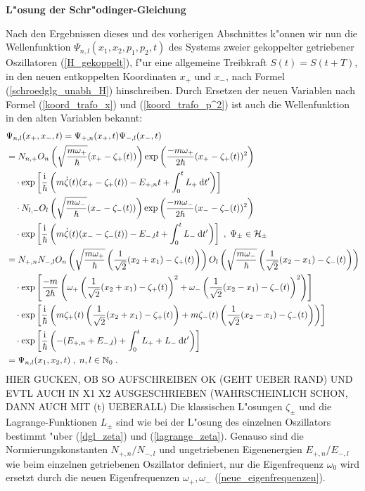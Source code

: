   \textbf{L"osung der Schr"odinger-Gleichung}

  Nach den Ergebnissen dieses und des vorherigen Abschnittes k"onnen wir nun die Wellenfunktion $\Psi_{n,l}(x_1,x_2,p_1,p_2,t)$ des Systems zweier gekoppelter getriebener Oszillatoren (\ref{H_gekoppelt}), f"ur eine allgemeine Treibkraft $S(t)=S(t+T)$, in den neuen entkoppelten Koordinaten $x_+$ und $x_-$, nach Formel (\ref{schroedglg_unabh_H}) hinschreiben.
  Durch Ersetzen der neuen Variablen nach Formel (\ref{koord_trafo_x}) und (\ref{koord_trafo_p^2}) ist auch die Wellenfunktion in den alten Variablen bekannt:
  \begin{align}
     &\Psi_{n,l}(x_+,x_-,t) = \Psi_{+,n}(x_+,t)\Psi_{-,l}(x_-,t) \notag\\
     &=N_{n,+}O_n\left(\sqrt{\frac{m\omega_+}{\hbar}}(x_+-\zeta_+(t))\right) \exp\left(\frac{-m\omega_+}{2\hbar}(x_+-\zeta_+(t))^2\right)\notag\\
     &\quad \cdot \exp\left[\frac{\text i}{\hbar}\left(m\dot \zeta(t)(x_+-\zeta_+(t))-E_{+,n}t+\int_0^tL_+\:\text dt'\right)\right] \quad\quad\quad\notag\\
     &\quad \cdot N_{l,-}O_l\left(\sqrt{\frac{m\omega_-}{\hbar}}(x_--\zeta_-(t))\right) \exp\left(\frac{-m\omega_-}{2\hbar}(x_--\zeta_-(t))^2\right)\notag\\
     &\quad \cdot \exp\left[\frac{\text i}{\hbar}\left(m\dot \zeta(t)(x_--\zeta_-(t))-E_{-,l}t+\int_0^tL_-\:\text dt'\right)\right] \;,\; \Psi_\pm \in \cal H_\pm \notag\\
    &= N_{+,n}N_{-,l} O_n\left(\sqrt{\frac{m\omega_+}{\hbar}}\left(\frac{1}{\sqrt{2}}(x_2+x_1)-\zeta_+(t)\right)\right)O_l\left(\sqrt{\frac{m\omega_-}{\hbar}}\left(\frac{1}{\sqrt{2}}(x_2-x_1)-\zeta_-(t)\right)\right) \notag\\
    &\quad\cdot \exp\left[\frac{-m}{2\hbar}\left(\omega_+\left(\frac{1}{\sqrt{2}}(x_2+x_1)-\zeta_+(t)\right)^2 + \omega_-\left(\frac{1}{\sqrt{2}}(x_2-x_1)-\zeta_-(t)\right)^2\right)\right] \notag\\
    &\quad\cdot \exp\left[\frac{\text i}{\hbar} \left(m\zeta_+(t)\left(\frac{1}{\sqrt{2}}(x_2+x_1)-\zeta_+(t)\right) + m\zeta_-(t)\left(\frac{1}{\sqrt{2}}(x_2-x_1)-\zeta_-(t)\right)\right) \right] \notag\\
    &\quad\cdot \exp \left[\frac{\text i}{\hbar}\left(-(E_{+,n}+E_{-,l})+\int_0^tL_++L_-\:\text dt'\right)\right] \notag\\
    &=\Psi_{n,l}(x_1,x_2,t) \; , \; n,l \in \mathbb N_0 \; .
  \end{align}
  HIER GUCKEN, OB SO AUFSCHREIBEN OK (GEHT UEBER RAND) UND EVTL AUCH IN X1 X2 AUSGESCHRIEBEN (WAHRSCHEINLICH SCHON, DANN AUCH MIT (t) UEBERALL)
  Die klassischen L"osungen $\zeta_\pm$ und die Lagrange-Funktionen $L_\pm$ sind wie bei der L"osung des einzelnen Oszillators bestimmt "uber (\ref{dgl_zeta}) und (\ref{lagrange_zeta}).
  Genauso sind die Normierungskonstanten $N_{+,n}/N_{-,l}$ und ungetriebenen Eigenenergien $E_{+,n}/E_{-,l}$ wie beim einzelnen getriebenen Oszillator definiert, nur die Eigenfrequenz $\omega_0$ wird ersetzt durch die neuen Eigenfrequenzen $\omega_+,\omega_-$ (\ref{neue_eigenfrequenzen}).

